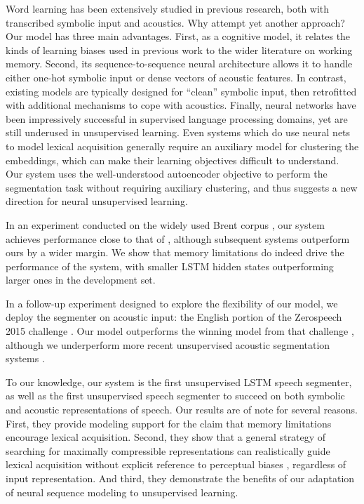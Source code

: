 \documentclass[11pt,letterpaper]{article}
\begin{document}
Word learning has been extensively studied in previous research, both
with transcribed symbolic input and acoustics. Why attempt yet another
approach? Our model has three main advantages. First, as a cognitive
model, it relates the kinds of learning biases used in previous work
to the wider literature on working memory. Second, its
sequence-to-sequence neural architecture allows it to handle either
one-hot symbolic input or dense vectors of acoustic features. In
contrast, existing models are typically designed for ``clean''
symbolic input, then retrofitted with additional mechanisms to cope
with acoustics. Finally, neural networks have been impressively
successful in supervised language processing domains, yet are still
underused in unsupervised learning. Even systems which do use neural
nets to model lexical acquisition generally require an auxiliary model
for clustering the embeddings, which can make their learning
objectives difficult to understand. Our system uses the
well-understood autoencoder objective to perform the segmentation task
without requiring auxiliary clustering, and thus suggests a new
direction for neural unsupervised learning.

In an experiment conducted on the widely used Brent corpus \cite{Brent99}, our system achieves performance close to that of , although subsequent systems outperform ours by a wider margin. 
We show that memory limitations do indeed drive the performance of the system, with smaller LSTM hidden states outperforming larger ones in the development set.

In a follow-up experiment designed to explore the flexibility of our model, we deploy the segmenter on acoustic input: the English portion of the Zerospeech 2015 challenge \cite{Versteegh15}.
Our model outperforms the winning model from that challenge \cite{Rasanen15}, although we underperform more recent unsupervised acoustic segmentation systems \cite{Kamper16,RasanenND}.

To our knowledge, our system is the first unsupervised LSTM speech segmenter, as well as the first unsupervised speech segmenter to succeed on both symbolic and acoustic representations of speech.
Our results are of note for several reasons.
First, they provide modeling support for the claim that memory limitations encourage lexical acquisition.
Second, they show that a general strategy of searching for maximally compressible representations can realistically guide lexical acquisition without explicit reference to perceptual biases \cite[c.f\ e.g.][]{Rasanen15}, regardless of input representation.
And third, they demonstrate the benefits of our adaptation of neural sequence modeling to unsupervised learning.
\end{document}
